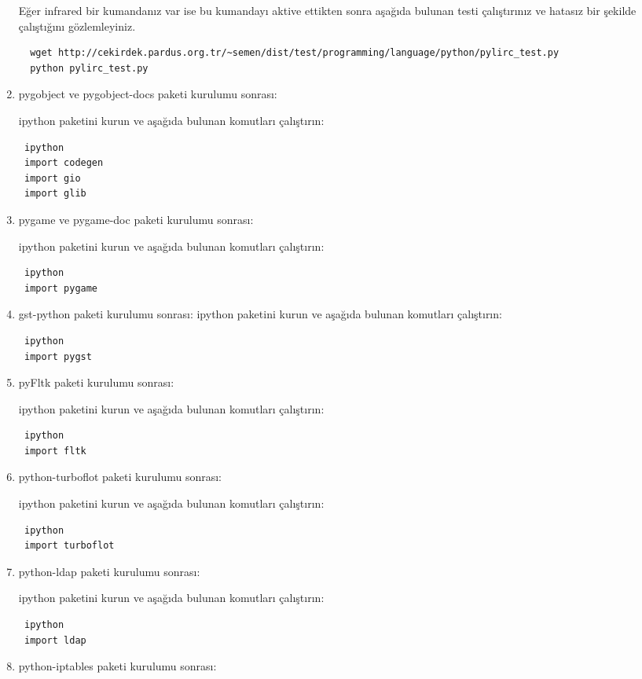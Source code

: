 \documentclass[a4paper,10pt]{article}
\begin{document}
\begin{enumerate}
Eğer infrared bir kumandanız var ise bu kumandayı aktive ettikten sonra aşağıda bulunan testi çalıştırınız ve hatasız bir şekilde çalıştığını gözlemleyiniz.
\begin{verbatim}
  wget http://cekirdek.pardus.org.tr/~semen/dist/test/programming/language/python/pylirc_test.py
  python pylirc_test.py
\end{verbatim}


\item pygobject ve pygobject-docs paketi kurulumu sonrası:

ipython paketini kurun ve aşağıda bulunan komutları çalıştırın:
\begin{verbatim}
 ipython
 import codegen
 import gio
 import glib
\end{verbatim}
\item pygame ve pygame-doc paketi kurulumu sonrası:

ipython paketini kurun ve aşağıda bulunan komutları çalıştırın:
\begin{verbatim}
 ipython
 import pygame
\end{verbatim}

\item gst-python paketi kurulumu sonrası:
ipython paketini kurun ve aşağıda bulunan komutları çalıştırın:
\begin{verbatim}
 ipython
 import pygst
\end{verbatim}

\item pyFltk paketi kurulumu sonrası:

ipython paketini kurun ve aşağıda bulunan komutları çalıştırın:
\begin{verbatim}
 ipython
 import fltk
\end{verbatim}

\item python-turboflot paketi kurulumu sonrası:

ipython paketini kurun ve aşağıda bulunan komutları çalıştırın:
\begin{verbatim}
 ipython
 import turboflot
\end{verbatim}

\item python-ldap paketi kurulumu sonrası:

ipython paketini kurun ve aşağıda bulunan komutları çalıştırın:
\begin{verbatim}
 ipython
 import ldap
\end{verbatim}

\item python-iptables paketi kurulumu sonrası:


\end{enumerate}
\end{document}

